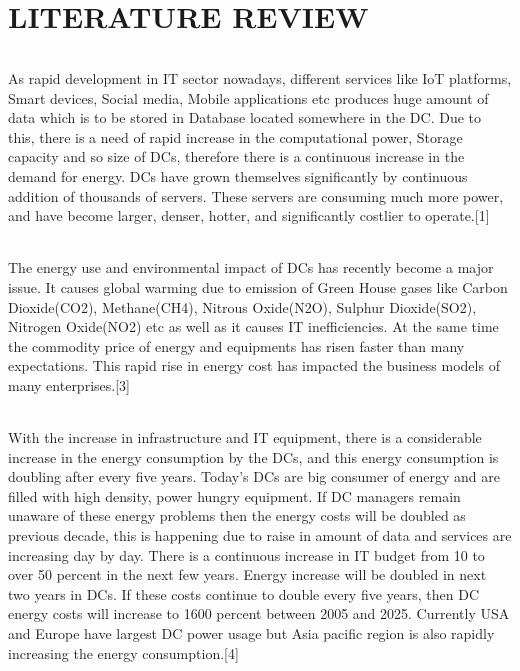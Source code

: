 \documentclass[12pt,a4paper]{report}
\begin{document}
\chapter{LITERATURE REVIEW}

\subparagraph{}
As rapid development in IT sector nowadays, different services like IoT platforms, Smart devices, Social media, Mobile applications etc produces huge amount of data which is to be stored in Database located somewhere in the DC. Due to this, there is a need of rapid increase in the computational power, Storage capacity and so size of DCs, therefore there is a continuous increase in the demand for energy. DCs have grown themselves significantly by continuous addition of thousands of servers. These servers are consuming much more power, and have become larger, denser, hotter, and significantly costlier to operate.[1]
\subparagraph{} 
The energy use and environmental impact of DCs has recently become a major issue. It causes global warming due to emission of Green House gases like Carbon Dioxide(CO2), Methane(CH4), Nitrous Oxide(N2O), Sulphur Dioxide(SO2), Nitrogen Oxide(NO2) etc as well as it causes IT inefficiencies. At the same time the commodity price of energy and equipments has risen faster than many expectations. This rapid rise in energy cost has impacted the business models of many enterprises.[3]
\subparagraph{}
With the increase in infrastructure and IT equipment, there is a considerable increase in the energy consumption by the DCs, and this energy consumption is doubling after every five years. Today’s DCs are big consumer of energy and are filled with high density, power hungry equipment. If DC managers remain unaware of these energy problems then the energy costs will be doubled as previous decade, this is happening due to raise in amount of data and services are increasing day by day. There is a continuous increase in IT budget from 10  to over 50 percent in the next few years. Energy increase will be doubled in next two years in DCs. If these costs continue to double every five years, then DC energy costs will increase to 1600 percent between 2005 and 2025. Currently USA and Europe have largest DC power usage but Asia pacific region is also rapidly increasing the energy consumption.[4]
\end{document}
